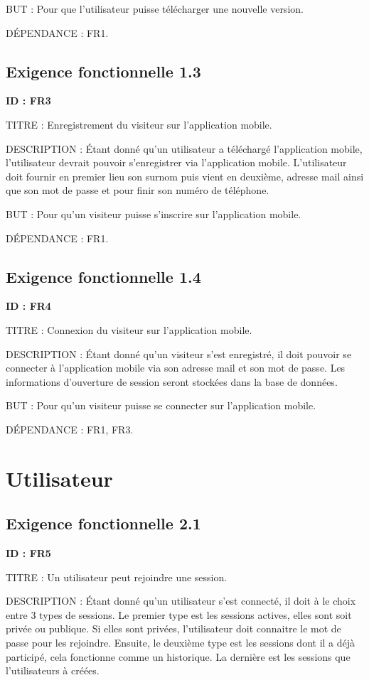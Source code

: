 \documentclass[titlepage, 12pt]{report}
\begin{document}
BUT : Pour que l'utilisateur puisse télécharger une nouvelle version.

DÉPENDANCE : FR1.

\subsection{Exigence fonctionnelle 1.3}

\textbf{ID : FR3}

TITRE : Enregistrement du visiteur sur l'application mobile.

DESCRIPTION : Étant donné qu'un utilisateur a téléchargé l'application mobile, l'utilisateur devrait pouvoir s'enregistrer via l'application mobile. L'utilisateur doit fournir en premier lieu son surnom puis vient en deuxième, adresse mail ainsi que son mot de passe et pour finir son numéro de téléphone.

BUT : Pour qu'un visiteur puisse s'inscrire sur l'application mobile.

DÉPENDANCE : FR1.

\subsection{Exigence fonctionnelle 1.4}

\textbf{ID : FR4}

TITRE : Connexion du visiteur sur l'application mobile.

DESCRIPTION : Étant donné qu'un visiteur s'est enregistré, il doit pouvoir se connecter à l'application mobile via son adresse mail et son mot de passe. Les informations d'ouverture de session seront stockées dans la base de données.

BUT : Pour qu'un visiteur puisse se connecter sur l'application mobile.

DÉPENDANCE : FR1, FR3.

\section{Utilisateur}

\subsection{Exigence fonctionnelle 2.1}

\textbf{ID : FR5}

TITRE : Un utilisateur peut rejoindre une session.

DESCRIPTION : Étant donné qu'un utilisateur s'est connecté, il doit à le choix entre 3 types de sessions. Le premier type est les sessions actives, elles sont soit privée ou publique. Si elles sont privées, l'utilisateur doit connaitre le mot de passe pour les rejoindre. Ensuite, le deuxième type est les sessions dont il a déjà participé, cela fonctionne comme un historique. La dernière est les sessions que l'utilisateurs à créées.
\end{document}
